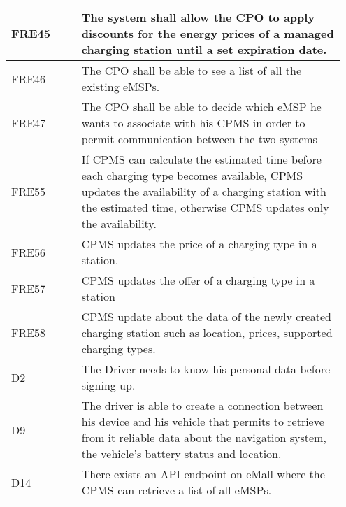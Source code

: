 {\begin{longtable}{|p{0.20\linewidth}p{0.75\linewidth} |}
    \hline
    \rowcolor{bluepoli!15} FRE45 &The system shall allow the CPO to apply discounts for the energy prices of a managed charging station until a set expiration date.\\
    \hline
    \rowcolor{bluepoli!15}
    FRE46 & The CPO shall be able to see a list of all the existing eMSPs. \\
    \hline
    \rowcolor{bluepoli!15} FRE47 &  The CPO shall be able to decide which eMSP he wants to associate with his CPMS in order to permit communication between the two systems \\
    \hline
    \rowcolor{bluepoli!15} FRE55 & If CPMS can calculate the estimated time before each charging type becomes available, CPMS updates the availability of a charging station with the estimated time, otherwise CPMS updates only the availability. \\
    \hline
    \rowcolor{bluepoli!15} FRE56 & CPMS updates the price of a charging type in a station. \\
    \hline  
    \rowcolor{bluepoli!15} FRE57 & CPMS updates the offer of a charging type in a station \\
    \hline  
     \rowcolor{bluepoli!15}
     FRE58 & CPMS update about the data of the newly created charging station such as location, prices, supported charging types. \\
     \hline
    
    \rowcolor{bluepoli!5} D2 & The Driver needs to know his personal data before signing up. \\
    \hline 
    \rowcolor{bluepoli!5} D9 & The driver is able to create a connection between his device and his vehicle that permits to retrieve from it reliable data about the navigation system, the vehicle’s battery status and location. \\
    \hline 
    \rowcolor{bluepoli!5} D14 &There exists an API endpoint on eMall where the CPMS can retrieve a list of all eMSPs. \\
    \hline 
\end{longtable}}
